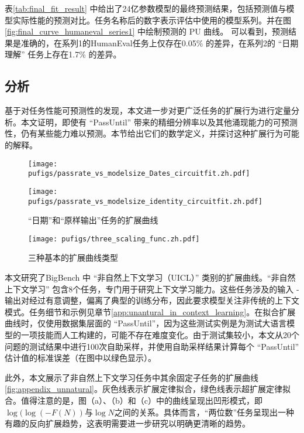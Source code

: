 表\ref{tab:final_fit_result} 中给出了24亿参数模型的最终预测结果，包括预测值与模型实际性能的预测对比。任务名称后的数字表示评估中使用的模型系列。并在图 \ref{fig:final_curve_humaneval_series1} 中绘制预测的 \textsc{PU} 曲线。 可以看到，预测结果是准确的，在系列1的HumanEval任务上仅存在0.05\% 的差异，在系列2的 “日期理解” 任务上存在1.7\% 的差异。 


\subsection{分析}
\label{sec:emergent}

{基于对任务性能可预测性的发现，本文进一步对更广泛任务的扩展行为进行定量分析。本文证明，即使有 “PassUntil” 带来的精细分辨率以及其他涌现能力的可预测性，仍有某些能力难以预测。本节给出它们的数学定义，并探讨这种扩展行为可能的解释。}
\begin{figure}
    \centering
        \centering
        \texttt{[image: pufigs/passrate\_vs\_modelsize\_Dates\_circuitfit.zh.pdf]}
        \centering
\end{figure}
\begin{figure}
        \texttt{[image: pufigs/passrate\_vs\_modelsize\_identity\_circuitfit.zh.pdf]}
        \caption{“日期”和“原样输出”任务的扩展曲线}
        \label{fig:unnatural}
\end{figure}
\begin{figure}
    \centering
    \texttt{[image: pufigs/three\_scaling\_func.zh.pdf]}
    \caption{三种基本的扩展曲线类型}
    \label{fig:threekindsofgrowth}
\end{figure}

本文研究了BigBench\citep{srivastava2022beyond} 中 “非自然上下文学习（UICL）” 类别的扩展曲线。“非自然上下文学习” 包含8个任务，专门用于研究上下文学习能力。这些任务涉及的输入 - 输出对经过有意调整，偏离了典型的训练分布，因此要求模型关注非传统的上下文模式。任务细节和示例见章节\ref{app:unantural_in_context_learning}。在拟合扩展曲线时，仅使用数据集层面的 “PassUntil”，因为这些测试实例是为测试大语言模型的一项技能而人工构建的，可能不存在难度变化。由于测试集较小，本文从20个问题的测试结果中进行100次自助采样，并使用自助采样结果计算每个 “PassUntil” 估计值的标准误差（在图中以绿色显示）。 

此外，本文展示了非自然上下文学习任务中其余固定子任务的扩展曲线\ref{fig:appendix_unnatural}。灰色线表示扩展定律拟合，绿色线表示超扩展定律拟合。值得注意的是，图（a）、（b）和（c）中的曲线呈现出凹形模式，即\(\log(\log(-F(N))\)与\(\log N\)之间的关系。具体而言，“两位数”任务呈现出一种有趣的反向扩展趋势，这表明需要进一步研究以明确更清晰的趋势。

